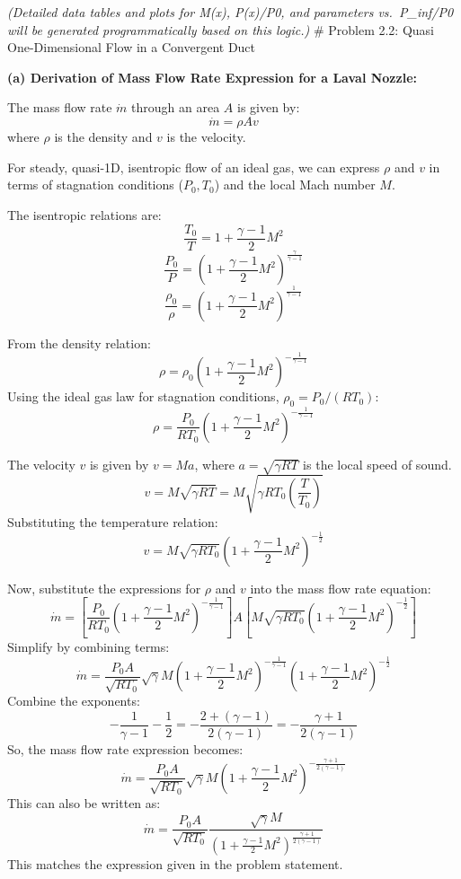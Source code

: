 \emph{(Detailed data tables and plots for M(x), P(x)/P0, and parameters
vs.~P\_inf/P0 will be generated programmatically based on this logic.)}
\# Problem 2.2: Quasi One-Dimensional Flow in a Convergent Duct

\textbf{(a) Derivation of Mass Flow Rate Expression for a Laval Nozzle:}

The mass flow rate \(\dot{m}\) through an area \(A\) is given by:
\[ \dot{m} = \rho A v \] where \(\rho\) is the density and \(v\) is the
velocity.

For steady, quasi-1D, isentropic flow of an ideal gas, we can express
\(\rho\) and \(v\) in terms of stagnation conditions (\(P_0, T_0\)) and
the local Mach number \(M\).

The isentropic relations are:
\[ \frac{T_0}{T} = 1 + \frac{\gamma-1}{2} M^2 \]
\[ \frac{P_0}{P} = \left( 1 + \frac{\gamma-1}{2} M^2 \right)^{\frac{\gamma}{\gamma-1}} \]
\[ \frac{\rho_0}{\rho} = \left( 1 + \frac{\gamma-1}{2} M^2 \right)^{\frac{1}{\gamma-1}} \]

From the density relation:
\[ \rho = \rho_0 \left( 1 + \frac{\gamma-1}{2} M^2 \right)^{-\frac{1}{\gamma-1}} \]
Using the ideal gas law for stagnation conditions,
\(\rho_0 = P_0 / (R T_0)\):
\[ \rho = \frac{P_0}{R T_0} \left( 1 + \frac{\gamma-1}{2} M^2 \right)^{-\frac{1}{\gamma-1}} \]

The velocity \(v\) is given by \(v = M a\), where
\(a = \sqrt{\gamma R T}\) is the local speed of sound.
\[ v = M \sqrt{\gamma R T} = M \sqrt{\gamma R T_0 \left( \frac{T}{T_0} \right)} \]
Substituting the temperature relation:
\[ v = M \sqrt{\gamma R T_0} \left( 1 + \frac{\gamma-1}{2} M^2 \right)^{-\frac{1}{2}} \]

Now, substitute the expressions for \(\rho\) and \(v\) into the mass
flow rate equation:
\[ \dot{m} = \left[ \frac{P_0}{R T_0} \left( 1 + \frac{\gamma-1}{2} M^2 \right)^{-\frac{1}{\gamma-1}} \right] A \left[ M \sqrt{\gamma R T_0} \left( 1 + \frac{\gamma-1}{2} M^2 \right)^{-\frac{1}{2}} \right] \]
Simplify by combining terms:
\[ \dot{m} = \frac{P_0 A}{\sqrt{R T_0}} \sqrt{\gamma} M \left( 1 + \frac{\gamma-1}{2} M^2 \right)^{-\frac{1}{\gamma-1}} \left( 1 + \frac{\gamma-1}{2} M^2 \right)^{-\frac{1}{2}} \]
Combine the exponents:
\[ -\frac{1}{\gamma-1} - \frac{1}{2} = -\frac{2 + (\gamma-1)}{2(\gamma-1)} = -\frac{\gamma+1}{2(\gamma-1)} \]
So, the mass flow rate expression becomes:
\[ \dot{m} = \frac{P_0 A}{\sqrt{R T_0}} \sqrt{\gamma} M \left( 1 + \frac{\gamma-1}{2} M^2 \right)^{-\frac{\gamma+1}{2(\gamma-1)}} \]
This can also be written as:
\[ \boxed{ \dot{m} = \frac{P_0 A}{\sqrt{R T_0}} \frac{\sqrt{\gamma} M}{\left(1 + \frac{\gamma-1}{2}M^2\right)^{\frac{\gamma+1}{2(\gamma-1)}}} } \]
This matches the expression given in the problem statement.

